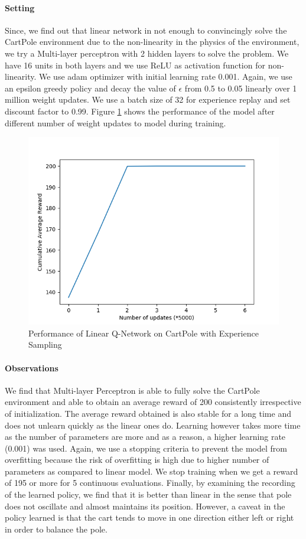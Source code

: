 \documentclass[12pt]{article}
\begin{document}
\paragraph{Setting} Since, we find out that linear network in not enough to convincingly solve the CartPole environment due to the non-linearity in the physics of the environment, we try a Multi-layer perceptron with 2 hidden layers to solve the problem. We have 16 units in both layers and we use ReLU as activation function for non-linearity. We use adam optimizer with initial learning rate 0.001. Again, we use an epsilon greedy policy and decay the value of $\epsilon$ from 0.5 to 0.05 linearly over 1 million weight updates. We use a batch size of 32 for experience replay and set discount factor to 0.99. Figure \ref{fig:03} shows the performance of the model after different number of weight updates to model during training.
\begin{figure}[h]
  \centering
  \vspace{-5mm}
  \includegraphics[width=0.8\linewidth]{figures/reward_plot_04.png}
  \caption{Performance of Linear Q-Network on CartPole with Experience Sampling}
  \label{fig:03}
\end{figure}
\paragraph{Observations} We find that Multi-layer Perceptron is able to fully solve the CartPole environment and able to obtain an average reward of 200 consistently irrespective of initialization. The average reward obtained is also stable for a long time and does not unlearn quickly as the linear ones do. Learning however takes more time as the number of parameters are more and as a reason, a higher learning rate (0.001) was used. Again, we use a stopping criteria to prevent the model from overfitting because the risk of overfitting is high due to higher number of parameters as compared to linear model. We stop training when we get a reward of 195 or more for 5 continuous evaluations. Finally, by examining the recording of the learned policy, we find that it is better than linear in the sense that pole does not oscillate and almost maintains its position. However, a caveat in the policy learned is that the cart tends to move in one direction either left or right in order to balance the pole.
\end{document}
